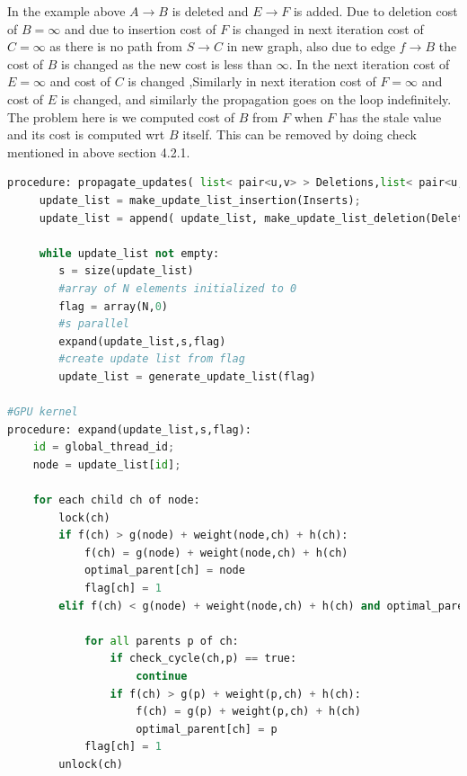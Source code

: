 \documentclass[a4paper]{article}
\begin{document}
In the example above $A \rightarrow B$ is deleted and $E \rightarrow F$ is added. Due to deletion cost of $B = \infty$  and due to insertion cost of $F$ is changed in next iteration cost of $C = \infty$ as there is no path from $S \rightarrow C$ in new graph, also due to edge $f \rightarrow B$ the cost of $B$ is changed as the new cost is less than $\infty$. In the next iteration cost of $E = \infty$ and cost of $C$ is changed ,Similarly in next iteration cost of $F = \infty$ and cost of $E$ is changed, and similarly the propagation goes on the loop indefinitely. The problem here is we computed cost of $B$ from $F$ when $F$ has the stale value and its cost is computed wrt $B$ itself. This can be removed by doing check mentioned in above section 4.2.1. 

\begin{lstlisting}[language=python, caption=Propagation of Updates]
procedure: propagate_updates( list< pair<u,v> > Deletions,list< pair<u,v> > Inserts, E, N):
     update_list = make_update_list_insertion(Inserts);
     update_list = append( update_list, make_update_list_deletion(Deletions) )
     
     while update_list not empty:
        s = size(update_list)
        #array of N elements initialized to 0
        flag = array(N,0)
        #s parallel
        expand(update_list,s,flag)
        #create update list from flag
        update_list = generate_update_list(flag)

#GPU kernel
procedure: expand(update_list,s,flag):
    id = global_thread_id;
    node = update_list[id];
    
    for each child ch of node:
        lock(ch)
        if f(ch) > g(node) + weight(node,ch) + h(ch):
            f(ch) = g(node) + weight(node,ch) + h(ch)  
            optimal_parent[ch] = node
            flag[ch] = 1
        elif f(ch) < g(node) + weight(node,ch) + h(ch) and optimal_parent[ch] == node:
            
            for all parents p of ch:
                if check_cycle(ch,p) == true:
                    continue
                if f(ch) > g(p) + weight(p,ch) + h(ch):
                    f(ch) = g(p) + weight(p,ch) + h(ch)
                    optimal_parent[ch] = p
            flag[ch] = 1
        unlock(ch)
\end{lstlisting}

\end{document}
